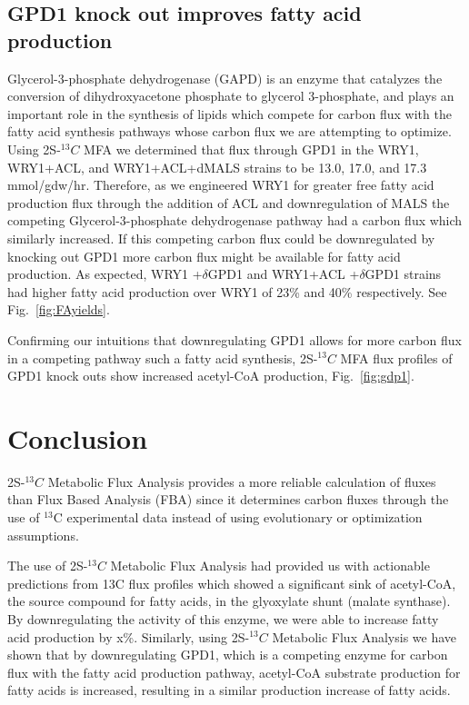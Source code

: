 \documentclass{bmcart}
\begin{document}
\subsection*{GPD1 knock out improves fatty acid production}
Glycerol-3-phosphate dehydrogenase (GAPD) is an enzyme that catalyzes the conversion of dihydroxyacetone phosphate to glycerol 3-phosphate, and plays an important role in the synthesis of lipids which compete for carbon flux with the fatty acid synthesis pathways whose carbon flux we are attempting to optimize. Using 2S-$^{13}C$ MFA we determined that flux through GPD1 in the WRY1, WRY1+ACL, and WRY1+ACL+dMALS strains to be 13.0, 17.0, and 17.3 mmol/gdw/hr. Therefore, as we engineered WRY1 for greater free fatty acid production flux through the addition of ACL and downregulation of MALS the competing Glycerol-3-phosphate dehydrogenase pathway had a carbon flux which similarly increased. If this competing carbon flux could be downregulated by knocking out GPD1 more carbon flux might be available for fatty acid production. As expected, WRY1 +$\delta$GPD1 and WRY1+ACL +$\delta$GPD1 strains had higher fatty acid production over WRY1 of 23\% and 40\% respectively. See Fig.~\ref{fig:FAyields}.

Confirming our intuitions that downregulating GPD1 allows for more carbon flux in a competing pathway such a fatty acid synthesis, 2S-$^{13}C$ MFA flux profiles of GPD1 knock outs show increased acetyl-CoA production, Fig.~\ref{fig:gdp1}.

\section*{Conclusion}
2S-$^{13}C$ Metabolic Flux Analysis provides a more reliable calculation of fluxes than Flux Based Analysis (FBA) since it determines carbon fluxes through the use of $^{13}$C  experimental data instead of using evolutionary or optimization  assumptions.

The use of 2S-$^{13}C$ Metabolic Flux Analysis had provided us with actionable predictions from 13C flux profiles which showed a significant sink of acetyl-CoA, the source compound for fatty acids, in the glyoxylate shunt (malate synthase). By downregulating the activity of this enzyme, we were able to increase fatty acid production by x\%. Similarly, using 2S-$^{13}C$ Metabolic Flux Analysis we have shown that by downregulating GPD1, which is a competing enzyme for carbon flux with the fatty acid production pathway, acetyl-CoA substrate production for fatty acids is increased, resulting in a similar production increase of fatty acids.
\end{document}
